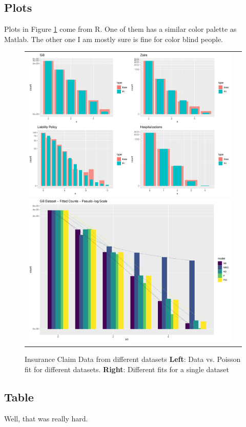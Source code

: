 \documentclass{article}
\begin{document}
\subsection{Plots}
Plots in Figure \ref{fig2} come from R. One of them has a similar color palette as Matlab. The other one I am mostly sure is fine for color blind people.

\begin{figure}[!htb]\center 
    \begin{tabular}{cc}
        \includegraphics[width=0.5\linewidth, trim = {0cm 0cm 2cm 0cm}, clip]{r_2x2nb.pdf}
        \includegraphics[width=0.5\linewidth,trim = {0cm 0cm 2cm 0cm}, clip]{r_gb_5counts.pdf}
    \end{tabular}
    \caption{\footnotesize Insurance Claim Data from different datasets \textbf{Left}: Data vs. Poisson fit for different datasets. \textbf{Right}: Different fits for a single dataset}
    \label{fig2}
\end{figure}

\newpage
\subsection{Table}
Well, that was really hard.
\end{document}
